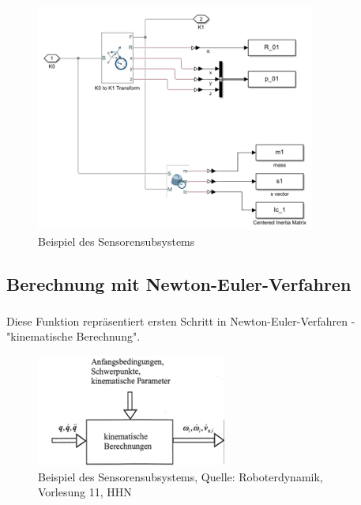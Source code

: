 	\begin{figure}[!htbp]
		\centering
		\includegraphics[width=1\linewidth]{grafic/sensor_koordinatensystem}
		\caption{Beispiel des Sensorensubsystems}
		\label{fig:sensoren_subsystem}
	\end{figure}


\subsection{Berechnung mit Newton-Euler-Verfahren}

	\subsubsection{}

	\subsubsection{}

Diese Funktion repräsentiert ersten Schritt in Newton-Euler-Verfahren - "kinematische Berechnung".

	\begin{figure}[!htbp]
		\centering
		\includegraphics[width=1\linewidth]{grafic/compute_kinematics_diagramm}
		\caption{Beispiel des Sensorensubsystems, Quelle: Roboterdynamik, Vorlesung 11, HHN}
		\label{fig:sensoren_subsystem}
	\end{figure}

